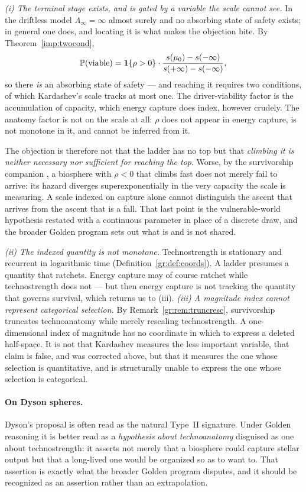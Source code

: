 \emph{(i) The terminal stage exists, and is gated by a variable the
scale cannot see.} In the driftless model $\Lambda_\infty=\infty$
almost surely and no absorbing state of safety exists; in general one
does, and locating it is what makes the objection bite. By
Theorem~\ref{imp:twocond},
\[
\mathbb{P}(\text{viable})=\mathbf{1}\{\rho>0\}\cdot
\frac{s(\mu_0)-s(-\infty)}{s(+\infty)-s(-\infty)},
\]
so there \emph{is} an absorbing state of safety --- and reaching it
requires two conditions, of which Kardashev's scale tracks at most one.
The driver-viability factor is the accumulation of capacity, which energy
capture does index, however crudely. The anatomy factor is not on the
scale at all: $\rho$ does not appear in energy capture, is not
monotone in it, and cannot be inferred from it.

The objection is therefore not that the ladder has no top but that
\emph{climbing it is neither necessary nor sufficient for reaching the
top}. Worse, by the survivorship companion \cite{GoldenSurvivorship}, a biosphere with
$\rho<0$ that climbs fast does not merely fail to arrive: its hazard
diverges superexponentially in the very capacity the scale is
measuring. A scale indexed on capture alone cannot distinguish the
ascent that arrives from the ascent that is a fall. That last point is
the vulnerable-world hypothesis \cite{Bostrom19} restated with a
continuous parameter in place of a discrete draw, and
the broader Golden program sets out what is and is not shared.

\emph{(ii) The indexed quantity is not monotone.} Technostrength is
stationary and recurrent in logarithmic time
(Definition~\ref{gr:def:coords}). A ladder presumes a quantity that
ratchets. Energy capture may of course ratchet while technostrength does
not --- but then energy capture is not tracking the quantity that
governs survival, which returns us to (iii). \emph{(iii) A magnitude index cannot represent categorical selection.}
By Remark~\ref{gr:rem:truncresc}, survivorship truncates technoanatomy
while merely rescaling technostrength. A one-dimensional index of
magnitude has no coordinate in which to express a deleted half-space. It
is not that Kardashev measures the less important variable, that
claim is false, and was corrected above, but that it measures the one
whose selection is quantitative, and is structurally unable to express
the one whose selection is categorical.

\paragraph{On Dyson spheres.}\label{gr:rem:dyson}
Dyson's proposal \cite{Dys60} is often read as the natural
Type~II signature. Under Golden reasoning it is better read as a
\emph{hypothesis about technoanatomy} disguised as one about
technostrength: it asserts not merely that a biosphere could capture
stellar output but that a long-lived one would be organized so as to
want to. That assertion is exactly what the broader Golden program
disputes, and it should be recognized as an assertion rather than an
extrapolation.


